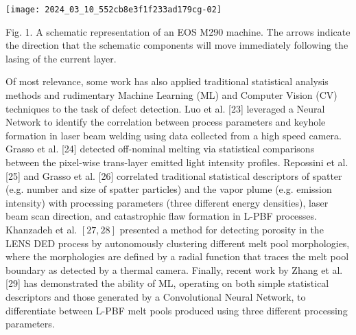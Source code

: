 \documentclass[10pt]{article}
\begin{document}
\begin{center}
\texttt{[image: 2024\_03\_10\_552cb8e3f1f233ad179cg-02]}
\end{center}

Fig. 1. A schematic representation of an EOS M290 machine. The arrows indicate the direction that the schematic components will move immediately following the lasing of the current layer.

Of most relevance, some work has also applied traditional statistical analysis methods and rudimentary Machine Learning (ML) and Computer Vision (CV) techniques to the task of defect detection. Luo et al. [23] leveraged a Neural Network to identify the correlation between process parameters and keyhole formation in laser beam welding using data collected from a high speed camera. Grasso et al. [24] detected off-nominal melting via statistical comparisons between the pixel-wise trans-layer emitted light intensity profiles. Repossini et al. [25] and Grasso et al. [26] correlated traditional statistical descriptors of spatter (e.g. number and size of spatter particles) and the vapor plume (e.g. emission intensity) with processing parameters (three different energy densities), laser beam scan direction, and catastrophic flaw formation in L-PBF processes. Khanzadeh et al. $[27,28]$ presented a method for detecting porosity in the LENS DED process by autonomously clustering different melt pool morphologies, where the morphologies are defined by a radial function that traces the melt pool boundary as detected by a thermal camera. Finally, recent work by Zhang et al. [29] has demonstrated the ability of ML, operating on both simple statistical descriptors and those generated by a Convolutional Neural Network, to differentiate between L-PBF melt pools produced using three different processing parameters.
\end{document}

